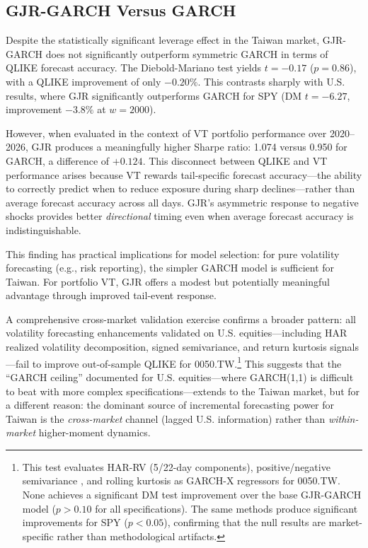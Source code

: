 \subsection{GJR-GARCH Versus GARCH}

Despite the statistically significant leverage effect in the Taiwan market, GJR-GARCH does not significantly outperform symmetric GARCH in terms of QLIKE forecast accuracy. The Diebold-Mariano test yields $t = -0.17$ ($p = 0.86$), with a QLIKE improvement of only $-0.20\%$. This contrasts sharply with U.S. results, where GJR significantly outperforms GARCH for SPY (DM $t = -6.27$, improvement $-3.8\%$ at $w = 2000$).

However, when evaluated in the context of VT portfolio performance over 2020--2026, GJR produces a meaningfully higher Sharpe ratio: 1.074 versus 0.950 for GARCH, a difference of $+0.124$. This disconnect between QLIKE and VT performance arises because VT rewards tail-specific forecast accuracy---the ability to correctly predict when to reduce exposure during sharp declines---rather than average forecast accuracy across all days. GJR's asymmetric response to negative shocks provides better \textit{directional} timing even when average forecast accuracy is indistinguishable.

This finding has practical implications for model selection: for pure volatility forecasting (e.g., risk reporting), the simpler GARCH model is sufficient for Taiwan. For portfolio VT, GJR offers a modest but potentially meaningful advantage through improved tail-event response.

A comprehensive cross-market validation exercise confirms a broader pattern: all volatility forecasting enhancements validated on U.S. equities---including HAR realized volatility decomposition, signed semivariance, and return kurtosis signals---fail to improve out-of-sample QLIKE for 0050.TW.\footnote{This test evaluates HAR-RV \citep{corsi2009} (5/22-day components), positive/negative semivariance \citep{barndorff2010}, and rolling kurtosis as GARCH-X regressors for 0050.TW. None achieves a significant DM test improvement over the base GJR-GARCH model ($p > 0.10$ for all specifications). The same methods produce significant improvements for SPY ($p < 0.05$), confirming that the null results are market-specific rather than methodological artifacts.} This suggests that the ``GARCH ceiling'' documented for U.S. equities---where GARCH(1,1) is difficult to beat with more complex specifications---extends to the Taiwan market, but for a different reason: the dominant source of incremental forecasting power for Taiwan is the \textit{cross-market} channel (lagged U.S. information) rather than \textit{within-market} higher-moment dynamics.


